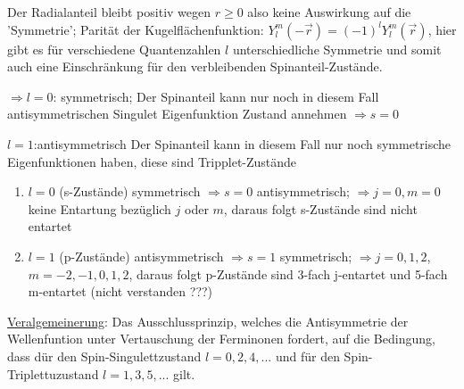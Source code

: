 

Der Radialanteil bleibt positiv wegen \(r\geq 0\) also keine Auswirkung auf die 'Symmetrie'; Parität der Kugelflächenfunktion: \(Y^m_l (-\vec r) = (-1)^lY^m_l(\vec r)\), hier gibt es für verschiedene Quantenzahlen \(l\) unterschiedliche Symmetrie und somit auch eine Einschränkung für den verbleibenden Spinanteil-Zustände.

\(\Rightarrow l=0\): symmetrisch;
Der Spinanteil kann nur noch in diesem Fall antisymmetrischen Singulet Eigenfunktion Zustand annehmen \(\Rightarrow s=0\) 


 \(l=1\):antisymmetrisch
Der Spinanteil kann in diesem Fall nur noch symmetrische Eigenfunktionen haben, diese sind Tripplet-Zustände


\begin{enumerate}
\item \(l=0\) (s-Zustände) symmetrisch
 \(\Rightarrow s=0\) antisymmetrisch;
 \(\Rightarrow j=0,m=0\) keine Entartung bezüglich \(j\) oder \(m\), daraus folgt s-Zustände sind nicht entartet
\item \(l=1\) (p-Zustände) antisymmetrisch
 \(\Rightarrow s=1\) symmetrisch;
 \(\Rightarrow j=0,1,2\), \(m=-2,-1,0,1,2\), daraus folgt p-Zustände sind 3-fach j-entartet und 5-fach m-entartet (nicht verstanden ???)
\end{enumerate}

\underline{Veralgemeinerung}: Das Ausschlussprinzip, welches die Antisymmetrie der Wellenfuntion unter Vertauschung der Ferminonen fordert, auf die Bedingung, dass dür den Spin-Singulettzustand \(l=0,2,4,...\) und für den Spin-Triplettuzustand \(l=1,3,5,...\) gilt.




